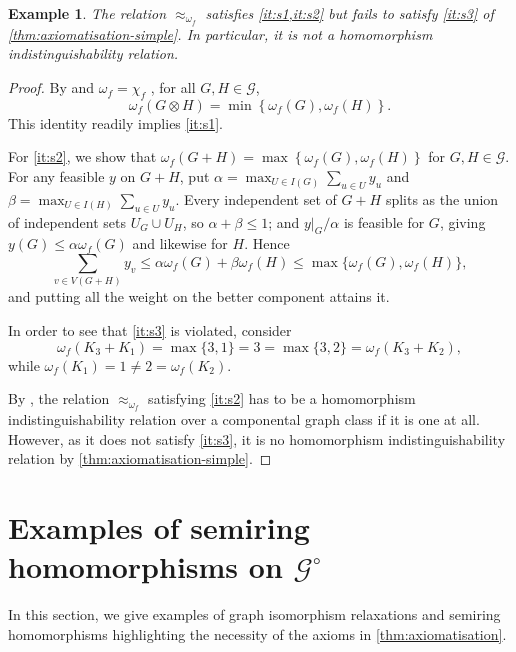 \documentclass[11pt]{scrartcl}
\theoremstyle{definition}
\theoremstyle{plain}
\newtheorem{example}[definition]{Example}
\theoremstyle{remark}
\newcommand{\lG}{\mathcal{G}^\circ}
\newcommand{\G}{\mathcal{G}}
\begin{document}
    \begin{example}\label{ex:fractional-clique-number}
        The relation $\approx_{\omega_f}$ satisfies \cref{it:s1,it:s2} but fails to satisfy \cref{it:s3} of \cref{thm:axiomatisation-simple}.
        In particular, it is not a homomorphism indistinguishability relation.
    \end{example}
    \begin{proof}
        By \cite[Theorem~2]{zhu_fractional_2011} and $\omega_f = \chi_f$ \cite{atserias_expressive_2021}, for all $G, H \in \G$,
        \[
            \omega_f(G \otimes H) = \min\left\{ \omega_f(G), \omega_f(H) \right\}.
        \]
        This identity readily implies \cref{it:s1}.
    
        For \cref{it:s2},
        we show that
        $\omega_f(G + H) = \max\left\{\omega_f(G), \omega_f(H)\right\}$ for $G, H \in \G$.
        For any feasible $y$ on $G+H$, put $\alpha = \max_{U \in  I(G)} \sum_{u\in U} y_u$ and $\beta = \max_{U \in  I(H)} \sum_{u\in U} y_u$. Every independent set of $G+H$ splits as the union of independent sets $U_G \cup U_H$, so $\alpha + \beta \le 1$; and $y|_G/\alpha$ is feasible for $G$, giving $y(G) \le \alpha\omega_f(G)$ and likewise for $H$. Hence \[ \sum_{v \in V(G + H)} y_v \le \alpha\omega_f(G) + \beta\omega_f(H) \le \max\{\omega_f(G),\omega_f(H)\},\] and putting all the weight on the better component attains it.

        In order to see that \cref{it:s3} is violated, consider
        $$\omega_f(K_3 + K_1) = \max\{3,1\} = 3 = \max\{3,2\} = \omega_f(K_3 + K_2),$$
        while $\omega_f(K_1) = 1 \neq 2 = \omega_f(K_2)$.

        By \cite[Theorem~7]{seppelt_logical_2024}, the relation $\approx_{\omega_f}$ satisfying \cref{it:s2} has to be a homomorphism indistinguishability  relation over a componental graph class if it is one at all.
        However, as it does not satisfy \cref{it:s3}, it is no homomorphism indistinguishability relation by \cref{thm:axiomatisation-simple}.
    \end{proof}
	

	\section{Examples of semiring homomorphisms on \texorpdfstring{$\lG$}{Gcirc}}
	\label{sec:examples}

	In this section, we give examples of graph isomorphism relaxations and semiring homomorphisms highlighting the necessity of the axioms in \cref{thm:axiomatisation}.
\end{document}

